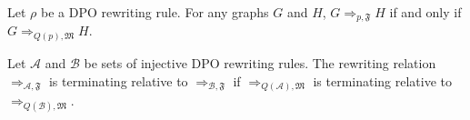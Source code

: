 \begin{lemma}
    Let $\rho$ be a DPO rewriting rule. For any graphs $G$ and $H$,
    $G \mathop{\Rightarrow}_{p,\mathfrak{F}} H$ if and only if $G \mathop{\Rightarrow}_{Q(p),\mathfrak{M}} H$.
\end{lemma}
\begin{corollary}
    \label{cor:termination}
    Let \(\mathcal{A}\) and \(\mathcal{B}\) be sets of injective DPO rewriting rules. 
    The rewriting relation $\mathop{\Rightarrow}_{\mathcal{A},\mathfrak{F}}$ is terminating relative to $\mathop{\Rightarrow}_{\mathcal{B},\mathfrak{F}}$ 
    if 
    $\mathop{\Rightarrow}_{Q(\mathcal{A}),\mathfrak{M}}$ is terminating relative to $\mathop{\Rightarrow}_{Q(\mathcal{B}),\mathfrak{M}}$.
\end{corollary}

